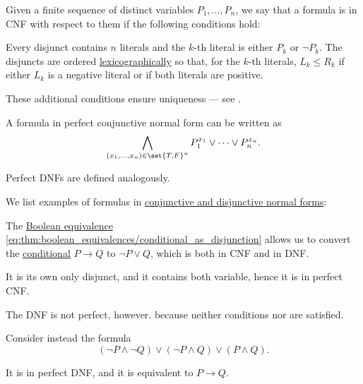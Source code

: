 \begin{definition}
\begin{thmenum}
     Given a finite sequence of distinct variables \( P_1, \ldots, P_n \), we say that a formula is in  CNF with respect to them if the following conditions hold:
    \begin{thmenum}
       Every disjunct contains \( n \) literals and the \( k \)-th literal is either \( P_k \) or \( \neg P_k \).
       The disjuncts are ordered \hyperref[def:lexicographic_order]{lexicographically} so that, for the \( k \)-th literals, \( L_k \leq R_k \) if either \( L_k \) is a negative literal or if both literals are positive.
    \end{thmenum}

    These additional conditions ensure uniqueness --- see .

    A formula in perfect conjunctive normal form can be written as
    \begin{equation*}
      \bigwedge_{(x_1, \ldots, x_n) \in \set{ T, F }^n} P_1^{x_1} \vee \cdots \vee P_n^{x_n}.
    \end{equation*}

    Perfect DNFs are defined analogously.
  \end{thmenum}
\end{definition}

\begin{example}\label{ex:def:cnf_and_dnf}
  We list examples of formulas in \hyperref[def:cnf_and_dnf]{conjunctive and disjunctive normal forms}:
  \begin{thmenum}
     The \hyperref[thm:boolean_equivalences]{Boolean equivalence} \eqref{eq:thm:boolean_equivalences/conditional_as_disjunction} allows us to convert the \hyperref[def:propositional_language/connectives/conditional]{conditional} \( P \to Q \) to \( \neg P \vee Q \), which is both in CNF and in DNF.

    It is its own only disjunct, and it contains both variable, hence it is in perfect CNF.

    The DNF is not perfect, however. because neither conditions  nor  are satisfied.

     Consider instead the formula
    \begin{equation*}
      (\neg P \wedge \neg Q) \vee (\neg P \wedge Q) \vee (P \wedge Q).
    \end{equation*}

    It is in perfect DNF, and it is equivalent to \( P \to Q \).
  \end{thmenum}
\end{example}

